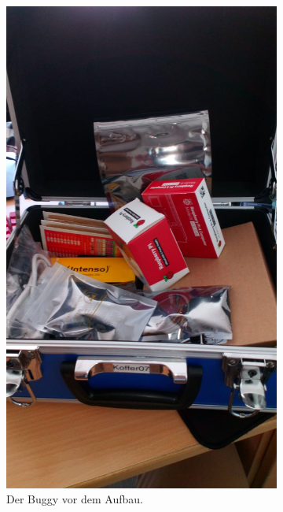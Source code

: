 \documentclass[12pt,twoside]{report}
\begin{document}
\begin{figure}[h!]
  \centering
  \captionsetup[subfigure]{labelformat=empty}
  \begin{subfigure}{0.45\linewidth}
    \includegraphics[width=\linewidth]{lernportfolio_assets/Buggy_Koffer.jpeg}
    \caption{Der Buggy vor dem Aufbau.}
  \end{subfigure}
  \begin{subfigure}{0.45\linewidth}

\end{subfigure}
\end{figure}
\end{document}
